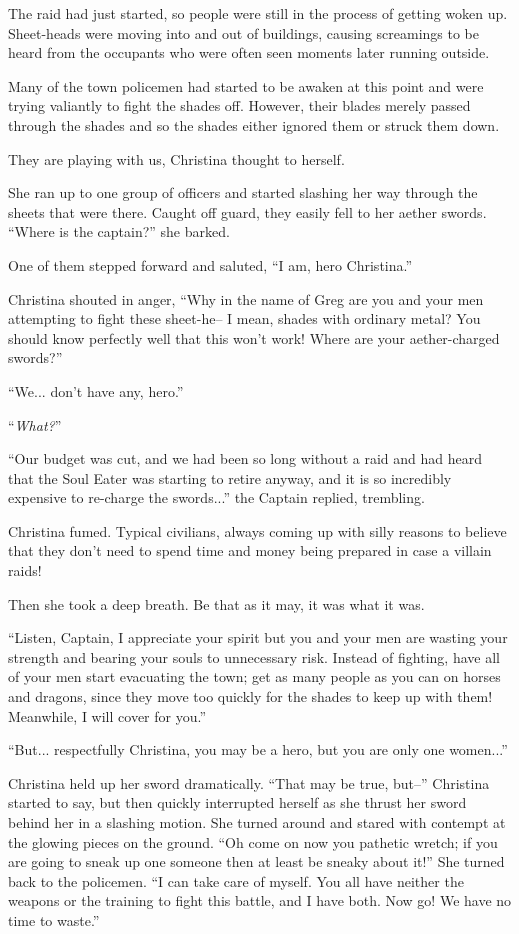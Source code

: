 \documentclass[showtrims,b6paper,draft,10pt]{memoir}
\begin{document}
The raid had just started, so people were still in the process of getting woken up.  Sheet-heads were moving into and out of buildings, causing screamings to be heard from the occupants who were often seen moments later running outside.

Many of the town policemen had started to be awaken at this point and were trying valiantly to fight the shades off.  However, their blades merely passed through the shades and so the shades either ignored them or struck them down.

They are playing with us, Christina thought to herself.

She ran up to one group of officers and started slashing her way through the sheets that were there.  Caught off guard, they easily fell to her aether swords.  ``Where is the captain?'' she barked.

One of them stepped forward and saluted,  ``I am, hero Christina.''

Christina shouted in anger,  ``Why in the name of Greg are you and your men attempting to fight these sheet-he-- I mean, shades with ordinary metal?  You should know perfectly well that this won't work!  Where are your aether-charged swords?''

``We... don't have any, hero.''

``\emph{What?}''

``Our budget was cut, and we had been so long without a raid and had heard that the Soul Eater was starting to retire anyway, and it is so incredibly expensive to re-charge the swords...'' the Captain replied, trembling.

Christina fumed.  Typical civilians, always coming up with silly reasons to believe that they don't need to spend time and money being prepared in case a villain raids!

Then she took a deep breath.  Be that as it may, it was what it was.

``Listen, Captain, I appreciate your spirit but you and your men are wasting your strength and bearing your souls to unnecessary risk.  Instead of fighting, have all of your men start evacuating the town;  get as many people as you can on horses and dragons, since they move too quickly for the shades to keep up with them!  Meanwhile, I will cover for you.''

``But... respectfully Christina, you may be a hero, but you are only one women...''

Christina held up her sword dramatically. ``That may be true, but--'' Christina started to say, but then quickly interrupted herself as she thrust her sword behind her in a slashing motion.  She turned around and stared with contempt at the glowing pieces on the ground.  ``Oh come on now you pathetic wretch;  if you are going to sneak up one someone then at least be sneaky about it!''  She turned back to the policemen.  ``I can take care of myself.  You all have neither the weapons or the training to fight this battle, and I have both.  Now go!  We have no time to waste.''
\end{document}
